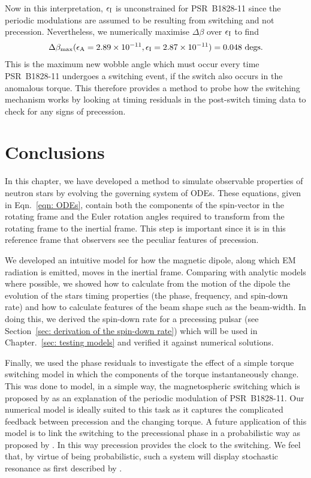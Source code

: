 \documentclass[../full_thesis/full_thesis.tex]{subfiles}
\begin{document}
Now in this interpretation, $\epsilon_{\mathrm{I}}$ is unconstrained for PSR~B1828-11 since the
periodic modulations are assumed to be resulting from switching and not
precession. Nevertheless, we numerically maximise $\Delta\beta$ over $\epsilon_{\mathrm{I}}$ to
find
\begin{align}
\Delta\beta_{\textrm{max}}(\epsilon_{\mathrm{A}}=2.89\times10^{-11}, \epsilon_{\mathrm{I}}=2.87\times10^{-11})
= 0.048 \textrm{ degs}.
\end{align}
This is the maximum new wobble angle which must occur every time PSR~B1828-11 undergoes a
switching event, if the switch also occurs in the anomalous torque. This
therefore provides a method to probe how the switching mechanism works by
looking at timing residuals in the post-switch timing data to check for
any signs of precession.

\section{Conclusions}
\label{sec: conclusion inertial}

In this chapter, we have developed a method to simulate observable properties
of neutron stars by evolving the governing system of ODEs. These equations,
given in Eqn.~\eqref{eqn: ODEs}, contain both the components of the spin-vector
in the rotating frame and the Euler rotation angles required to transform from
the rotating frame to the inertial frame. This step is important since it is in
this reference frame that observers see the peculiar features of precession.

We developed an intuitive model for how the magnetic dipole, along which EM
radiation is emitted, moves in the inertial frame. Comparing with analytic
models where possible, we showed how to calculate from the motion of the
dipole the evolution of the stars timing properties (the phase, frequency, and
spin-down rate) and how to calculate features of the beam shape such as the
beam-width. In doing this, we derived the spin-down rate for a precessing pulsar
(see Section~\ref{sec: derivation of the spin-down rate}) which will be used in
Chapter.~\ref{sec: testing models} and verified it against numerical solutions.

Finally, we used the phase residuals to investigate the effect of a simple torque
switching model in which the components of the torque instantaneously change.
This was done to model, in a simple way, the magnetospheric switching which is
proposed by \citet{Lyne2010} as an explanation of the periodic modulation of
PSR~B1828-11. Our numerical model is ideally suited to this task as it captures the
complicated feedback between precession and the changing torque.
A future application of this model is to link the switching to the precessional
phase in a probabilistic way as proposed by \citet{Jones2012}. In this way
precession provides the clock to the switching. We feel that, by virtue of
being probabilistic, such a system will display stochastic resonance as first
described by \citet{Cordes2013}.

\biblio
\end{document}
